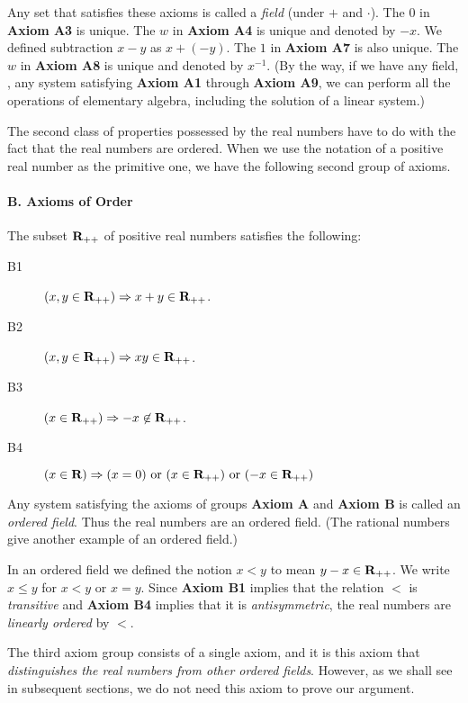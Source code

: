 \documentclass{article}
\begin{document}
Any set that satisfies these axioms is called a \emph{field} (under $+$ and $\cdot$).
The $0$ in {\bf Axiom A3} is unique.
The $w$ in {\bf Axiom A4} is unique and denoted by $-x$.
We defined subtraction $x-y$ as $x+(-y)$.
The $1$ in {\bf Axiom A7} is also unique.
The $w$ in {\bf Axiom A8} is unique and denoted by $x^{-1}$.
(By the way, if we have any field,
\ie,
any system satisfying {\bf Axiom A1} through {\bf Axiom A9},
we can perform all the operations of elementary algebra,
including the solution of a linear system.)


The second class of properties possessed by the real numbers
have to do with the fact that the real numbers are ordered.
When we use the notation of a positive real number
as the primitive one,
we have the following second group of axioms.

\paragraph{B. Axioms of Order}
The subset ${{\mbox{\bf R}}_{++}}$ of positive real numbers satisfies the following:

\begin{description}
\item[B1] $(x,y\in{{\mbox{\bf R}}_{++}}) \Rightarrow x + y \in{{\mbox{\bf R}}_{++}}$.
\item[B2] $(x,y\in{{\mbox{\bf R}}_{++}}) \Rightarrow x y \in{{\mbox{\bf R}}_{++}}$.
\item[B3] $(x\in{{\mbox{\bf R}}_{++}}) \Rightarrow -x \not\in{{\mbox{\bf R}}_{++}}$.
\item[B4] $(x\in{\mbox{\bf R}}) \Rightarrow (x=0) \mbox{ or } (x\in{{\mbox{\bf R}}_{++}}) \mbox{ or } (-x\in{{\mbox{\bf R}}_{++}})$
\end{description}

Any system satisfying the axioms of groups {\bf Axiom A} and {\bf Axiom B} is called an \emph{ordered field}.
Thus the real numbers are an ordered field.
(The rational numbers give another example of an ordered field.)

In an ordered field we defined the notion $x<y$ to mean $y-x\in{{\mbox{\bf R}}_{++}}$.
We write $x\leq y$ for $x<y$ or $x=y$.
Since {\bf Axiom B1} implies that the relation $<$ is \emph{transitive}
and {\bf Axiom B4} implies that it is \emph{antisymmetric},
the real numbers are \emph{linearly ordered} by $<$.

The third axiom group consists of a single axiom,
and it is this axiom that \emph{distinguishes the real numbers from other ordered fields}.
However, as we shall see in subsequent sections, we do not need this axiom to prove our argument.
\end{document}

